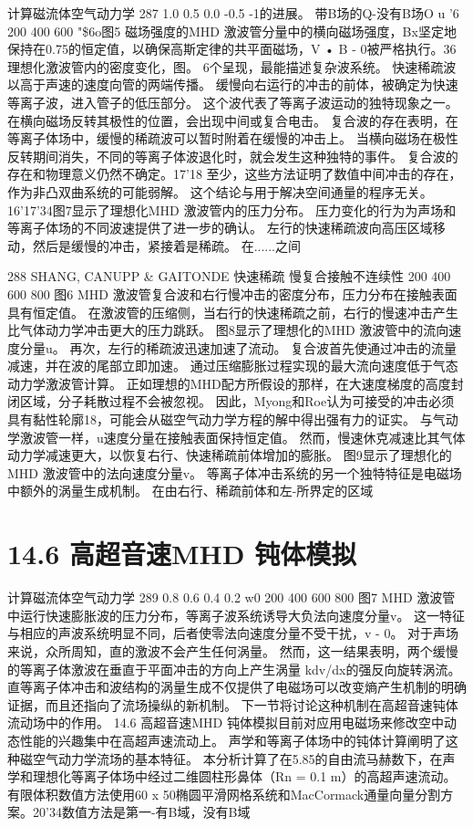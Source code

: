 \documentclass[UTF8,11pt,a4paper,openany,fontset=fandol]{ctexbook}
\begin{document}
计算磁流体空气动力学 287 1.0 0.5 0.0 -0.5 -1的进展。 带B场的Q-没有B场O u '6 200 400 600 "\$6o图5 磁场强度的MHD 激波管分量中的横向磁场强度，Bx坚定地保持在0.75的恒定值，以确保高斯定律的共平面磁场，V • B - 0被严格执行。36理想化激波管内的密度变化，图。 6个呈现，最能描述复杂波系统。 快速稀疏波以高于声速的速度向管的两端传播。 缓慢向右运行的冲击的前体，被确定为快速等离子波，进入管子的低压部分。 这个波代表了等离子波运动的独特现象之一。 在横向磁场反转其极性的位置，会出现中间或复合电击。 复合波的存在表明，在等离子体场中，缓慢的稀疏波可以暂时附着在缓慢的冲击上。 当横向磁场在极性反转期间消失，不同的等离子体波退化时，就会发生这种独特的事件。 复合波的存在和物理意义仍然不确定。17'18 至少，这些方法证明了数值中间冲击的存在，作为非凸双曲系统的可能弱解。 这个结论与用于解决空间通量的程序无关。16'17'34图7显示了理想化MHD 激波管内的压力分布。 压力变化的行为为声场和等离子体场的不同波速提供了进一步的确认。 左行的快速稀疏波向高压区域移动，然后是缓慢的冲击，紧接着是稀疏。 在......之间

288 SHANG, CANUPP \& GAITONDE 快速稀疏 慢复合接触不连续性 200 400 600 800 图6 MHD 激波管复合波和右行慢冲击的密度分布，压力分布在接触表面具有恒定值。 在激波管的压缩侧，当右行的快速稀疏之前，右行的慢速冲击产生比气体动力学冲击更大的压力跳跃。 图8显示了理想化的MHD 激波管中的流向速度分量u。 再次，左行的稀疏波迅速加速了流动。 复合波首先使通过冲击的流量减速，并在波的尾部立即加速。 通过压缩膨胀过程实现的最大流向速度低于气态动力学激波管计算。 正如理想的MHD配方所假设的那样，在大速度梯度的高度封闭区域，分子耗散过程不会被忽视。 因此，Myong和Roe认为可接受的冲击必须具有黏性轮廓18，可能会从磁空气动力学方程的解中得出强有力的证实。 与气动学激波管一样，u速度分量在接触表面保持恒定值。 然而，慢速休克减速比其气体动力学减速更大，以恢复右行、快速稀疏前体增加的膨胀。 图9显示了理想化的MHD 激波管中的法向速度分量v。 等离子体冲击系统的另一个独特特征是电磁场中额外的涡量生成机制。 在由右行、稀疏前体和左-所界定的区域

\section{14.6 高超音速MHD 钝体模拟}
计算磁流体空气动力学 289 0.8 0.6 0.4 0.2 w0 200 400 600 800 图7 MHD 激波管中运行快速膨胀波的压力分布，等离子波系统诱导大负法向速度分量v。 这一特征与相应的声波系统明显不同，后者使零法向速度分量不受干扰，v - 0。 对于声场来说，众所周知，直的激波不会产生任何涡量。 然而，这一结果表明，两个缓慢的等离子体激波在垂直于平面冲击的方向上产生涡量 kdv/dx的强反向旋转涡流。 直等离子体冲击和波结构的涡量生成不仅提供了电磁场可以改变熵产生机制的明确证据，而且还指向了流场操纵的新机制。 下一节将讨论这种机制在高超音速钝体流动场中的作用。 14.6 高超音速MHD 钝体模拟目前对应用电磁场来修改空中动态性能的兴趣集中在高超声速流动上。 声学和等离子体场中的钝体计算阐明了这种磁空气动力学流场的基本特征。 本分析计算了在5.85的自由流马赫数下，在声学和理想化等离子体场中经过二维圆柱形鼻体（Rn = 0.1 m）的高超声速流动。 有限体积数值方法使用60 x 50椭圆平滑网格系统和MacCormack通量向量分割方案。20'34数值方法是第一-有B域，没有B域
\end{document}
